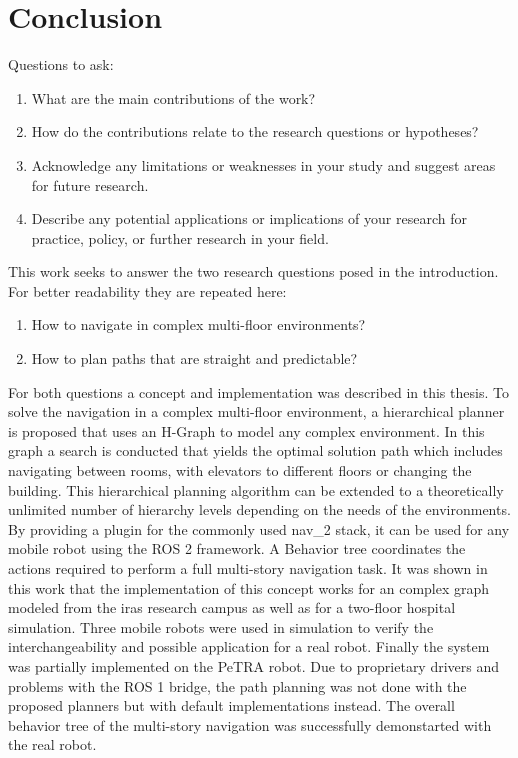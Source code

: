 \chapter{Conclusion}
\label{sec:conclusion}
Questions to ask:
\begin{enumerate}
    \item What are the main contributions of the work? 
    \item How do the contributions relate to the research questions or hypotheses? 
    \item Acknowledge any limitations or weaknesses in your study and suggest areas for future research. 
    \item Describe any potential applications or implications of your research for practice, policy, or further research in your field. 
\end{enumerate}


This work seeks to answer the two research questions posed in the introduction. For better readability they are repeated here:

\begin{enumerate}
    \item How to navigate in complex multi-floor environments?
    \item How to plan paths that are straight and predictable?
\end{enumerate}

For both questions a concept and implementation was described in this thesis. To solve the navigation in a complex multi-floor environment, a hierarchical planner is proposed that uses an H-Graph to model any complex environment. In this graph a search is conducted that yields the optimal solution path which includes navigating between rooms, with elevators to different floors or changing the building. This hierarchical planning algorithm can be extended to a theoretically unlimited number of hierarchy levels depending on the needs of the environments. By providing a plugin for the commonly used \gls{nav_2} stack, it can be used for any mobile robot using the ROS 2 framework. A Behavior tree coordinates the actions required to perform a full multi-story navigation task. It was shown in this work that the implementation of this concept works for an complex graph modeled from the \gls{iras} research campus as well as for a two-floor hospital simulation. Three mobile robots were used in simulation to verify the interchangeability and possible application for a real robot. Finally the system was partially implemented on the PeTRA robot. Due to proprietary drivers and problems with the ROS 1 bridge, the path planning was not done with the proposed planners but with default implementations instead. The overall behavior tree of the multi-story navigation was successfully demonstarted with the real robot.

